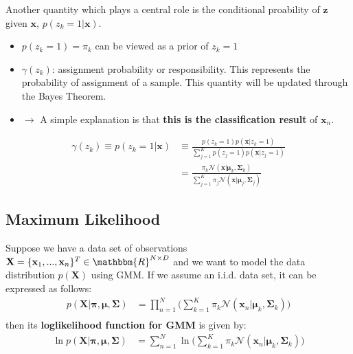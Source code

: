 Another quantity which plays a central role is the conditional proability of $\mathbf{z}$ given $\mathbf{x}$, $p(z_k=1|\mathbf{x})$. 
\begin{itemize}
\item $p(z_k=1) = \pi_k$ can be viewed as a prior of $z_k=1$
\item $\gamma(z_k)$: assignment probability or responsibility. This represents the probability of assignment of a sample.  This quantity will be updated through the Bayes Theorem.
\item[] $\rightarrow$  A simple explanation is that \textbf{this is the classification result} of $\mathbf{x}_n$.
\end{itemize}
\begin{align*}
\gamma(z_k) \equiv p(z_k=1|\mathbf{x}) & \equiv \frac{p(z_k=1)p(\mathbf{x}|z_k=1)}{\sum_{j=1}^{K}p(z_j=1)p(\mathbf{x}|z_j=1)} \\
& = \frac{\pi_k\mathcal{N}(\mathbf{x}|\boldsymbol{\mu}_k, \boldsymbol{\Sigma}_k)}{\sum_{j=1}^{K} \pi_j\mathcal{N}(\mathbf{x}|\boldsymbol{\mu}_j, \boldsymbol{\Sigma}_j)}
\end{align*}

\subsection{Maximum Likelihood}
Suppose we have a data set of observations $\mathbf{X}=\{\mathbf{x}_1,...,\mathbf{x}_n\}^{T}\in\mathbbm{R}^{N\times D}$ and we want to model the data distribution $p(\mathbf{X})$ using GMM. If we assume an \textrm{i.i.d.} data set, it can be expressed as follows: 
\begin{align*}
p(\mathbf{X}|\boldsymbol{\pi},\boldsymbol{\mu},\boldsymbol{\Sigma}) &=\prod_{n=1}^{N}\Bigg(\sum_{k=1}^{K}\pi_k\mathcal{N}(\mathbf{x}_n|\boldsymbol{\mu}_k, \boldsymbol{\Sigma}_k)\Bigg)\\
\end{align*}
then its \textbf{loglikelihood function for GMM} is given by:
\begin{align*}
\ln p(\mathbf{X}|\boldsymbol{\pi},\boldsymbol{\mu},\boldsymbol{\Sigma}) &= \sum_{n=1}^{N}\ln \Bigg(\sum_{k=1}^{K}\pi_k\mathcal{N}(\mathbf{x}_n|\boldsymbol{\mu}_k, \boldsymbol{\Sigma}_k)\Bigg)
\end{align*}

